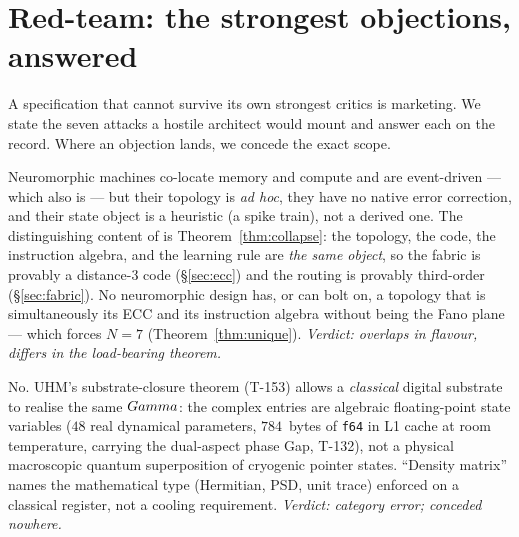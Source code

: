 \section{Red-team: the strongest objections, answered}
\label{sec:redteam}

A specification that cannot survive its own strongest critics is marketing.
We state the seven attacks a hostile architect would mount and answer each on
the record. Where an objection lands, we concede the exact scope.

\begin{redteambox}
Neuromorphic machines co-locate memory and compute and are event-driven ---
which \TALOS{} also is --- but their topology is \emph{ad hoc}, they have no
native error correction, and their state object is a heuristic (a spike
train), not a derived one. The distinguishing content of \TALOS{} is
Theorem~\ref{thm:collapse}: the topology, the code, the instruction algebra,
and the learning rule are \emph{the same object}, so the fabric is provably a
distance-3 code (\S\ref{sec:ecc}) and the routing is provably third-order
(\S\ref{sec:fabric}). No neuromorphic design has, or can bolt on, a topology
that is simultaneously its ECC and its instruction algebra without being the
Fano plane --- which forces $N=7$ (Theorem~\ref{thm:unique}). \emph{Verdict:
overlaps in flavour, differs in the load-bearing theorem.}
\end{redteambox}

\begin{redteambox}
No. UHM's substrate-closure theorem (T-153) allows a \emph{classical} digital
substrate to realise the same $Gamma$: the complex entries are algebraic
floating-point state variables ($48$ real dynamical parameters, $784$~bytes of
\texttt{f64} in L1 cache at room temperature, carrying the dual-aspect phase
Gap, T-132), not a physical macroscopic quantum superposition of cryogenic
pointer states. ``Density matrix'' names the mathematical type (Hermitian, PSD,
unit trace) enforced on a classical register, not a cooling requirement.
\emph{Verdict: category error; conceded nowhere.}
\end{redteambox}

